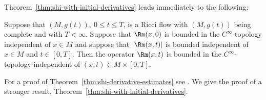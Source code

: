 Theorem~\ref{thm:shi-with-initial-derivatives} leads immediately to the following:

\begin{corollary}\label{cor:ricci-flow-curvature-bounds}
\label{Cinftybd}
Suppose that $(M,g(t)),\ 0\le t\le T$, is a Ricci flow
with $(M,g(t))$ being complete and with $T<\infty$. Suppose that
$\Rm(x,0)$ is bounded in the $C^\infty$-topology
independent of $x\in M$ and suppose that
$\left\vert\Rm(x,t)\right\vert$ is bounded
independent of $x\in M$ and $t\in[0,T]$. Then  the operator
$\Rm(x,t)$  is bounded in the $C^\infty$-topology
independent of $(x,t)\in M\times [0,T]$.
\end{corollary}


 For a proof of Theorem~\ref{thm:shi-derivative-estimates}  see \cite{Shi1, Shi2}. We give the proof of
a stronger result, Theorem~\ref{thm:shi-with-initial-derivatives}.

